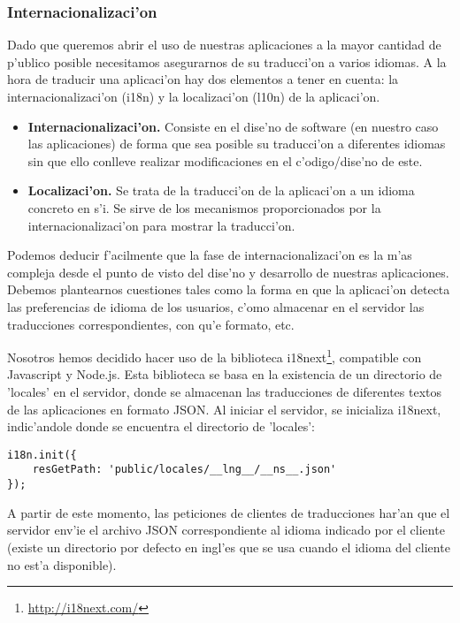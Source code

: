 \subsubsection{Internacionalizaci'on}
\label{sub:internacionalizacion}

Dado que queremos abrir el uso de nuestras aplicaciones a la mayor cantidad de p'ublico posible necesitamos
asegurarnos de su traducci'on a varios idiomas. A la hora de traducir una aplicaci'on hay dos elementos a tener en
cuenta: la internacionalizaci'on (i18n) y la localizaci'on (l10n) de la aplicaci'on.

\begin{itemize}
\item \textbf{Internacionalizaci'on.} Consiste en el dise'no de software (en nuestro caso las aplicaciones) de forma
que sea posible su traducci'on a diferentes idiomas sin que ello conlleve realizar modificaciones en el
c'odigo/dise'no de este.
\item \textbf{Localizaci'on.} Se trata de la traducci'on de la aplicaci'on a un idioma concreto en s'i. Se sirve de
los mecanismos proporcionados por la internacionalizaci'on para mostrar la traducci'on.
\end{itemize}

Podemos deducir f'acilmente que la fase de internacionalizaci'on es la m'as compleja desde el punto de visto del
dise'no y desarrollo de nuestras aplicaciones. Debemos plantearnos cuestiones tales como la forma en que la
aplicaci'on detecta las preferencias de idioma de los usuarios, c'omo almacenar en el servidor las traducciones
correspondientes, con qu'e formato, etc.

Nosotros hemos decidido hacer uso de la biblioteca i18next\footnote{\url{http://i18next.com/}}, compatible con 
Javascript y Node.js. Esta biblioteca se basa en la existencia de un directorio de 'locales' en el servidor, donde 
se almacenan las traducciones de diferentes textos de las aplicaciones en formato JSON. Al iniciar el servidor, se 
inicializa i18next, indic'andole donde se encuentra el directorio de 'locales':

\begin{verbatim}
i18n.init({
    resGetPath: 'public/locales/__lng__/__ns__.json'
});
\end{verbatim}

A partir de este momento, las peticiones de clientes de traducciones har'an que el servidor env'ie el archivo JSON
correspondiente al idioma indicado por el cliente (existe un directorio por defecto en ingl'es que se usa cuando el
idioma del cliente no est'a disponible).

